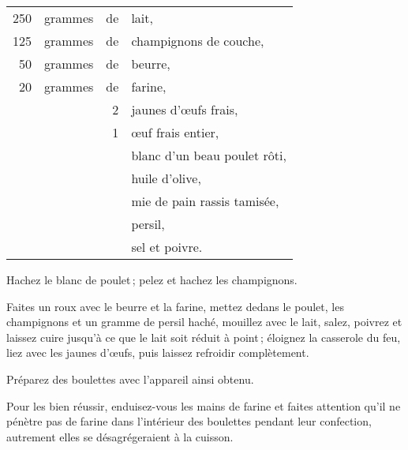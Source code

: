 \footnotesize
\begin{longtable}{rrrp{16em}}
    250 & grammes & de & lait,                                                                            \\
    125 & grammes & de & champignons de couche,                                                           \\
     50 & grammes & de & beurre,                                                                          \\
     20 & grammes & de & farine,                                                                          \\
        &         &  2 & jaunes d'œufs frais,                                                             \\
        &         &  1 & œuf frais entier,                                                                \\
        &         &    & blanc d'un beau poulet rôti,                                                     \\
        &         &    & huile d'olive,                                                                   \\
        &         &    & mie de pain rassis tamisée,                                                      \\
        &         &    & persil,                                                                          \\
        &         &    & sel et poivre.                                                                   \\
\end{longtable}
\normalsize

Hachez le blanc de poulet ; pelez et hachez les champignons.

Faites un roux avec le beurre et la farine, mettez dedans le poulet, les
champignons et un gramme de persil haché, mouillez avec le lait, salez, poivrez
et laissez cuire jusqu'à ce que le lait soit réduit à point ; éloignez la
casserole du feu, liez avec les jaunes d'œufs, puis laissez refroidir
complètement.

Préparez des boulettes avec l'appareil ainsi obtenu.

Pour les bien réussir, enduisez-vous les mains de farine et faites attention
qu'il ne pénètre pas de farine dans l'intérieur des boulettes pendant leur
confection, autrement elles se désagrégeraient à la cuisson.

